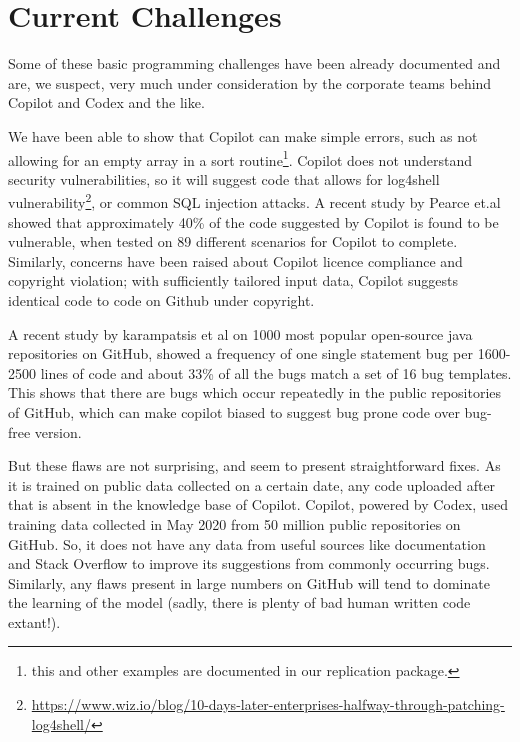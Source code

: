\label{chapter:background}

\newlength{\savedunitlength}
\setlength{\unitlength}{2em}



\setlength{\unitlength}{\savedunitlength}

\section{Current Challenges}
Some of these basic programming challenges have been already documented and are, we suspect, very much under consideration by the corporate teams behind Copilot and Codex and the like. 

We have been able to show that Copilot can make simple errors, such as not allowing for an empty array in a sort routine\footnote{this and other examples are documented in our replication package.}. Copilot does not understand security vulnerabilities, so it will suggest code that allows for \textsf{log4shell} vulnerability\footnote{\url{https://www.wiz.io/blog/10-days-later-enterprises-halfway-through-patching-log4shell/}}, or common SQL injection attacks. A recent study by Pearce et.al \cite{copilot_security} showed that approximately 40\% of the code suggested by Copilot is found to be vulnerable, when tested on 89 different scenarios for Copilot to complete.
Similarly, concerns have been raised about Copilot licence compliance and copyright violation; with sufficiently tailored input data, Copilot suggests identical code to code on Github under copyright. 

A recent study by karampatsis et al \cite{github_bugs} on 1000 most popular open-source java repositories on GitHub, showed a frequency of one single statement bug per 1600-2500 lines of code and about 33\% of all the bugs match a set of 16 bug templates. This shows that there are bugs which occur repeatedly in the public repositories of GitHub, which can make copilot biased to suggest bug prone code over bug-free version.

But these flaws are not surprising, and seem to present straightforward fixes.
As it is trained on public data collected on a certain date, any code uploaded after that is absent in the knowledge base of Copilot. Copilot, powered by Codex, used training data collected in May 2020 from 50 million public repositories on GitHub\cite{copilot}. So, it does not have any data from useful sources like documentation and Stack Overflow to improve its suggestions from commonly occurring bugs.
Similarly, any flaws present in large numbers on GitHub will tend to dominate the learning of the model (sadly, there is plenty of bad human written code extant!).

